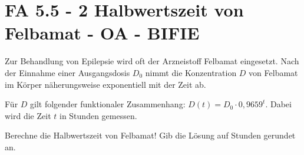 \section{FA 5.5 - 2 Halbwertszeit von Felbamat - OA - BIFIE}

\begin{beispiel}[FA 5.5]{1} %
Zur Behandlung von Epilepsie wird oft der Arzneistoff Felbamat eingesetzt. Nach der Einnahme einer Ausgangsdosis $D_0$ nimmt die Konzentration $D$ von Felbamat im Körper näherungsweise exponentiell mit der Zeit ab. \leer

Für $D$ gilt folgender funktionaler Zusammenhang: $D(t) = D_0 \cdot 0,9659^t$.
Dabei wird die Zeit $t$ in Stunden gemessen. 

\leer

Berechne die Halbwertszeit von Felbamat! Gib die Lösung auf Stunden gerundet an.

\leer

\end{beispiel}